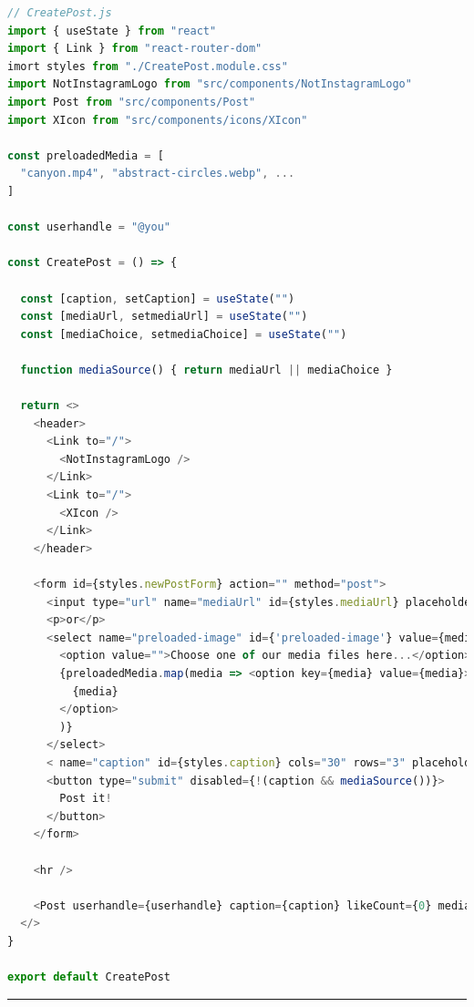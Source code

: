 \documentclass[a4paper, 12pt]{article}
\begin{document}
\begin{lstlisting}[caption=Create in React, label={lst:React:Create}, language=JavaScript]
// CreatePost.js
import { useState } from "react"
import { Link } from "react-router-dom"
imort styles from "./CreatePost.module.css"
import NotInstagramLogo from "src/components/NotInstagramLogo"
import Post from "src/components/Post"
import XIcon from "src/components/icons/XIcon"

const preloadedMedia = [
  "canyon.mp4", "abstract-circles.webp", ...
]

const userhandle = "@you"

const CreatePost = () => {

  const [caption, setCaption] = useState("")
  const [mediaUrl, setmediaUrl] = useState("")
  const [mediaChoice, setmediaChoice] = useState("")

  function mediaSource() { return mediaUrl || mediaChoice }

  return <>
    <header>
      <Link to="/">
        <NotInstagramLogo />
      </Link>
      <Link to="/">
        <XIcon />
      </Link>
    </header>

    <form id={styles.newPostForm} action="" method="post">
      <input type="url" name="mediaUrl" id={styles.mediaUrl} placeholder="Insert your media URL here..." value={mediaUrl} onChange={(event) => setmediaUrl(event.target.value)} />
      <p>or</p>
      <select name="preloaded-image" id={'preloaded-image'} value={mediaChoice} onChange={(event) => setmediaChoice(event.target.value)}>
        <option value="">Choose one of our media files here...</option>
        {preloadedMedia.map(media => <option key={media} value={media}>
          {media}
        </option>
        )}
      </select>
      < name="caption" id={styles.caption} cols="30" rows="3" placeholder="Type your caption here" value={caption} onChange={(event) => setCaption(event.target.value)} />
      <button type="submit" disabled={!(caption && mediaSource())}>
        Post it!
      </button>
    </form>

    <hr />

    <Post userhandle={userhandle} caption={caption} likeCount={0} mediaSource={mediaSource()} hideActionIcons={true} />
  </>
}

export default CreatePost
\end{lstlisting}

\vspace{0.5cm} \hrule \vspace{0.5cm}
\end{document}
